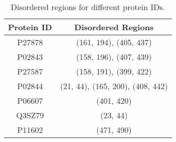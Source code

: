 \begin{table}[H]
\centering
\begin{tabular}{|c|c|}
\hline
\textbf{Protein ID} & \textbf{Disordered Regions} \\ \hline
P27878 & (161, 194), (405, 437) \\ \hline
P02843 & (158, 196), (407, 439) \\ \hline
P27587 & (158, 191), (399, 422) \\ \hline
P02844 & (21, 44), (165, 200), (408, 442) \\ \hline
P06607 & (401, 420) \\ \hline
Q3SZ79 & (23, 44) \\ \hline
P11602 & (471, 490) \\ \hline
\end{tabular}
\caption{Disordered regions for different protein IDs.}
\label{tab:disordered_regions}
\end{table}

